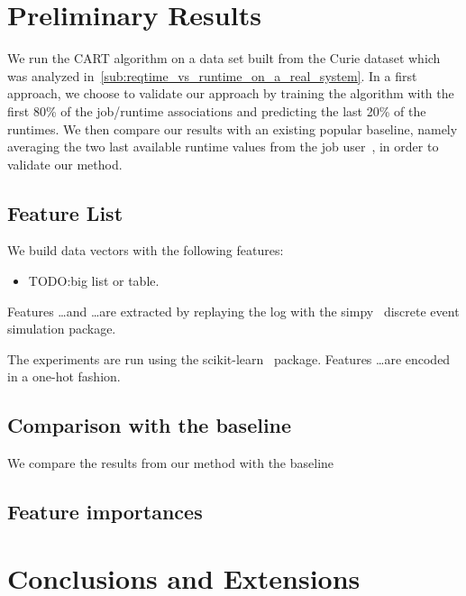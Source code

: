 \documentclass{article}
\begin{document}
\section{Preliminary Results}
\label{sec:preliminary_results}
We run the CART algorithm on a data set built from the Curie dataset which was analyzed in~\ref{sub:reqtime_vs_runtime_on_a_real_system}. In a first approach, we choose to validate our approach by training the algorithm with the first 80\% of the job/runtime associations and predicting the last 20\% of the runtimes. We then compare our results with an existing popular baseline, namely averaging the two last available runtime values from the job user~\cite{tsafir}, in order to validate our method.

\subsection{Feature List}
\label{sub:feature_list}
We build data vectors with the following features:
\begin{itemize}
  \item TODO:big list or table.
\end{itemize}
Features \ldots and \ldots are extracted by replaying the log with the simpy~\cite{simpy} discrete event simulation package.

The experiments are run using the scikit-learn~\cite{scikit-learn} package. Features \ldots are encoded in a one-hot fashion.


\subsection{Comparison with the baseline}
\label{sub:comparison_with_average_baseline}
We compare the results from our method with the baseline



\subsection{Feature importances}
\label{sub:feature_importances}





\section{Conclusions and Extensions}
\label{sec:conclusions}
\end{document}
